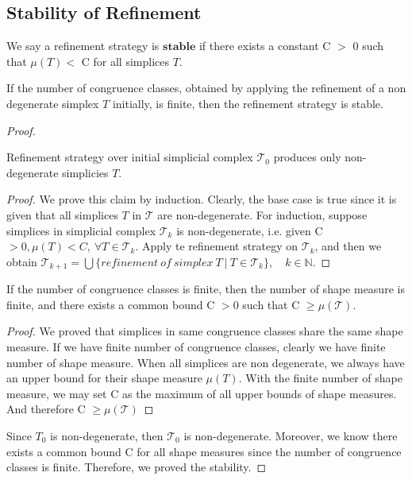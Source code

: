     \subsection{Stability of Refinement}
    \begin{definition*}
    We say a refinement strategy is $\textbf{stable}$ if there exists a constant C $>$ 0 such that $\mu(T)<$ C for all simplices $T$.
    \end{definition*}
    
    \begin{theorem*}
    If the number of congruence classes, obtained by applying the refinement of a non degenerate simplex $T$ initially, is finite, then the refinement strategy is stable.
    \end{theorem*}
    \begin{proof}
    \begin{claim*}
    Refinement strategy over initial simplicial complex $\mathcal{T_0}$ produces only non-degenerate simplicies $T$.
    \begin{proof}
    We prove this claim by induction.
    Clearly, the base case is true since it is given that all simplices $T$ in $\mathcal{T}$ are non-degenerate. For induction, suppose simplices in simplicial complex $\mathcal{T}_k$ is non-degenerate, i.e. given C $> 0, \mu(T) < C, ~\forall T \in\mathcal{T}_k$. Apply te refinement strategy on $\mathcal{T}_k$, and then we obtain $\mathcal{T}_{k+1} = \bigcup\{refinement~of~simplex~T ~\vert ~T\in\mathcal{T}_{k}\}, \quad k\in\mathbb{N}$. 
    \end{proof}
    \end{claim*}

    \begin{claim*}
    If the number of congruence classes is finite, then the number of shape measure is finite, and there exists a common bound C $> 0$ such that C $\geq \mu(\mathcal{T})$.
    \begin{proof}
    We proved that simplices in same congruence classes share the same shape measure. If we have finite number of congruence classes, clearly we have finite number of shape measure. When all simplices are non degenerate, we always have an upper bound for their shape measure $\mu(T)$. With the finite number of shape measure, we may set C as the maximum of all upper bounds of shape measures. And therefore C $\geq \mu(\mathcal{T})$
    \end{proof}
    \end{claim*}

    Since $T_0$ is non-degenerate, then $\mathcal{T_0}$ is non-degenerate. Moreover, we know there exists a common bound C for all shape measures since the number of congruence classes is finite. Therefore, we proved the stability.
    \end{proof}
    
